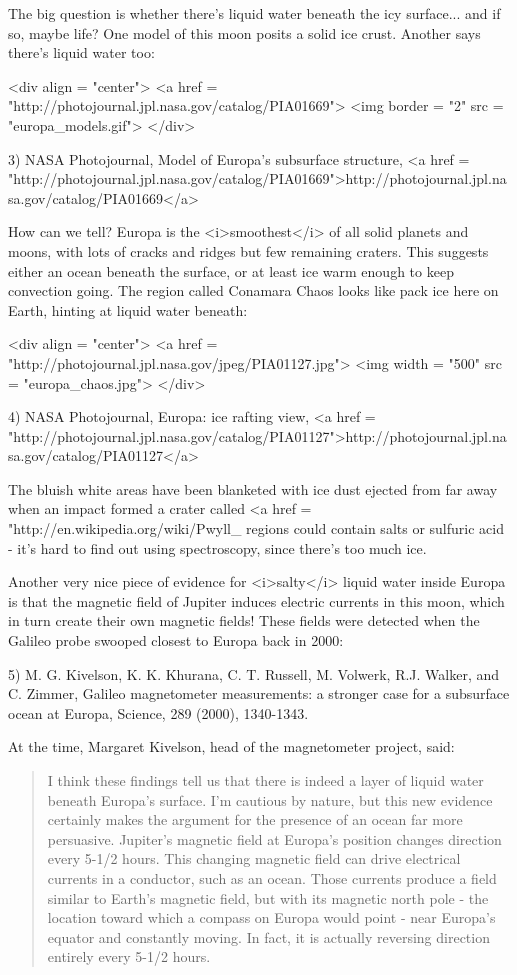 The big question is whether there's liquid water beneath the icy
surface... and if so, maybe life?  One model of this moon posits a 
solid ice crust.  Another says there's liquid water too:

<div align = "center">
<a href = "http://photojournal.jpl.nasa.gov/catalog/PIA01669">
<img border = "2" src = "europa_models.gif">
</div>

3) NASA Photojournal, Model of Europa's subsurface structure,
<a href = "http://photojournal.jpl.nasa.gov/catalog/PIA01669">http://photojournal.jpl.nasa.gov/catalog/PIA01669</a>

How can we tell?  Europa is the <i>smoothest</i> of all solid planets
and moons, with lots of cracks and ridges but few remaining craters.
This suggests either an ocean beneath the surface, or at least ice
warm enough to keep convection going.  The region called Conamara
Chaos looks like pack ice here on Earth, hinting at liquid water
beneath:

<div align = "center">
<a href = "http://photojournal.jpl.nasa.gov/jpeg/PIA01127.jpg">
<img width = "500" src = "europa_chaos.jpg">
</div>

4) NASA Photojournal, Europa: ice rafting view,
<a href = "http://photojournal.jpl.nasa.gov/catalog/PIA01127">http://photojournal.jpl.nasa.gov/catalog/PIA01127</a>

The bluish white areas have been blanketed with ice dust ejected from
far away when an impact formed a crater called <a href = "http://en.wikipedia.org/wiki/Pwyll_%
regions could contain salts or sulfuric acid - it's hard to find out
using spectroscopy, since there's too much ice.

Another very nice piece of evidence for <i>salty</i> liquid water inside 
Europa is that the magnetic field of Jupiter induces electric currents 
in  this moon, which in turn create their own magnetic fields!  These 
fields were detected when the Galileo probe swooped closest to Europa
back in 2000:

5) M. G. Kivelson, K. K. Khurana, C. T. Russell, M. Volwerk, R.J. Walker, 
and C. Zimmer, Galileo magnetometer measurements: a stronger case for a 
subsurface ocean at Europa, Science, 289 (2000), 1340-1343.

At the time, Margaret Kivelson, head of the magnetometer project, said: 

\begin{quote}
  I think these findings tell us that there is indeed a layer of liquid 
  water beneath Europa's surface.  I'm cautious by nature, but this new 
  evidence certainly makes the argument for the presence of an ocean far 
  more persuasive.  Jupiter's magnetic field at Europa's position changes 
  direction every 5-1/2 hours.  This changing magnetic field can drive 
  electrical currents in a conductor, such as an ocean. Those currents 
  produce a field similar to Earth's magnetic field, but with its magnetic 
  north pole - the location toward which a compass on Europa would point - 
  near Europa's equator and constantly moving. In fact, it is actually 
  reversing direction entirely every 5-1/2 hours.
\end{quote}

